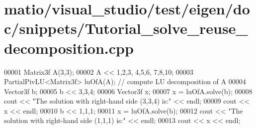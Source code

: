 \hypertarget{matio_2visual__studio_2test_2eigen_2doc_2snippets_2_tutorial__solve__reuse__decomposition_8cpp_source}{}\section{matio/visual\+\_\+studio/test/eigen/doc/snippets/\+Tutorial\+\_\+solve\+\_\+reuse\+\_\+decomposition.cpp}
\label{matio_2visual__studio_2test_2eigen_2doc_2snippets_2_tutorial__solve__reuse__decomposition_8cpp_source}

\begin{DoxyCode}
00001 Matrix3f A(3,3);
00002 A << 1,2,3,  4,5,6,  7,8,10;
00003 PartialPivLU<Matrix3f> luOfA(A); \textcolor{comment}{// compute LU decomposition of A}
00004 Vector3f b;
00005 b << 3,3,4;
00006 Vector3f x;
00007 x = luOfA.solve(b);
00008 cout << \textcolor{stringliteral}{"The solution with right-hand side (3,3,4) is:"} << endl;
00009 cout << x << endl;
00010 b << 1,1,1;
00011 x = luOfA.solve(b);
00012 cout << \textcolor{stringliteral}{"The solution with right-hand side (1,1,1) is:"} << endl;
00013 cout << x << endl;
\end{DoxyCode}
